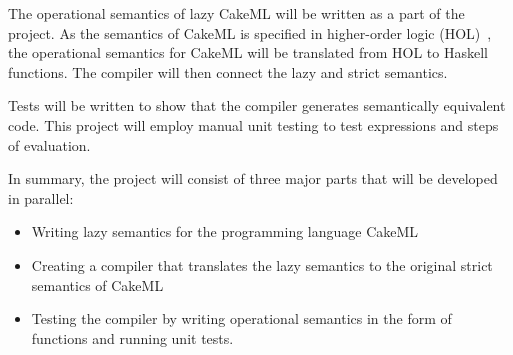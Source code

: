 The operational semantics of lazy CakeML will be written as a part of the
project. As the semantics of CakeML is specified in higher-order logic
(HOL)~\cite{HOLInter57:online},
the operational semantics for CakeML will be translated from HOL to Haskell
functions. The compiler will then connect the lazy and strict semantics.

Tests will be written to show that the compiler generates semantically
equivalent code. This project will employ manual unit testing to test
expressions and steps of evaluation.

In summary, the project will consist of three major parts that will be developed
in parallel:
\begin{itemize}
 \item Writing lazy semantics for the programming language CakeML
 \item Creating a compiler that translates the lazy semantics to the original strict semantics of CakeML
 \item Testing the compiler by writing operational semantics in the form of functions and running unit tests.
\end{itemize}
